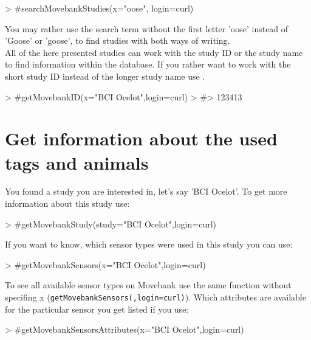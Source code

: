 \documentclass[article,nojss]{jss}
\newcommand{\fct}[1]{{\code{#1()}}}
\begin{document}
\begin{Schunk}
\begin{Sinput}
> #searchMovebankStudies(x="oose", login=curl)
\end{Sinput}
\end{Schunk}
You may rather use the search term without the first letter 'oose' instead of 'Goose' or 'goose', to find studies with both ways of writing. \\
All of the here presented studies can work with the study ID or the study name to find information within the database. If you rather want to work with the short study ID instead of the longer study name use \fct{getMovebankID}.

\begin{Schunk}
\begin{Sinput}
> #getMovebankID(x="BCI Ocelot",login=curl)
> #> 123413
\end{Sinput}
\end{Schunk}

\section*{Get information about the used tags and animals}
You found a study you are interested in, let's say 'BCI Ocelot'. To get more information about this study use:

\begin{Schunk}
\begin{Sinput}
> #getMovebankStudy(study="BCI Ocelot",login=curl)
\end{Sinput}
\end{Schunk}
If you want to know, which sensor types were used in this study you can use:

\begin{Schunk}
\begin{Sinput}
> #getMovebankSensors(x="BCI Ocelot",login=curl)
\end{Sinput}
\end{Schunk}

To see all available sensor types on Movebank use the same function without specifing x (\texttt{getMovebankSensors(,login=curl)}). Which attributes are available for the particular sensor you get listed if you use:

\begin{Schunk}
\begin{Sinput}
> #getMovebankSensorsAttributes(x="BCI Ocelot",login=curl)
\end{Sinput}
\end{Schunk}
\end{document}
